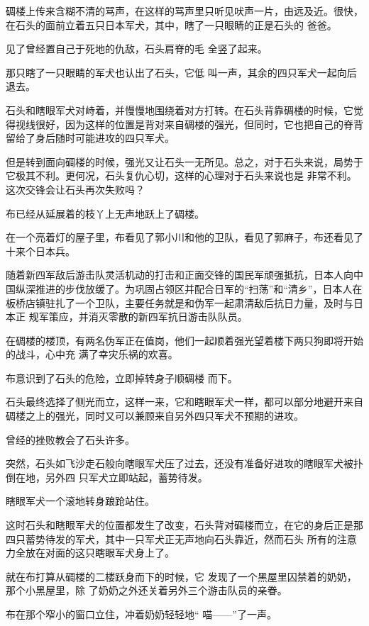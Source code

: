 \documentclass{article}
\begin{document}
碉楼上传来含糊不清的骂声，在这样的骂声里只听见吠声一片，由远及近。很快，在石头的面前立着五只日本军犬，其中，瞎了一只眼睛的正是石头的
爸爸。 

见了曾经置自己于死地的仇敌，石头肩脊的毛
全竖了起来。 

那只瞎了一只眼睛的军犬也认出了石头，它低
叫一声，其余的四只军犬一起向后退去。 

石头和瞎眼军犬对峙着，并慢慢地围绕着对方打转。在石头背靠碉楼的时候，它觉得视线很好，因为这样的位置是背对来自碉楼的强光，但同时，它也把自己的脊背留给了身后随时可能进攻的四只军犬。

\newpage

但是转到面向碉楼的时候，强光又让石头一无所见。总之，对于石头来说，局势于它极其不利。更何况，石头复仇心切，这样的心理对于石头来说也是
非常不利。这次交锋会让石头再次失败吗？ 

布已经从延展着的枝丫上无声地跃上了碉楼。

在一个亮着灯的屋子里，布看见了郭小川和他的卫队，看见了郭麻子，布还看见了十来个日本兵。

随着新四军敌后游击队灵活机动的打击和正面交锋的国民军顽强抵抗，日本人向中国纵深推进的步伐放缓了。为巩固占领区并配合日军的“扫荡”和“清乡”，日本人在板桥店镇驻扎了一个卫队，主要任务就是和伪军一起肃清敌后抗日力量，及时与日本正
规军策应，并消灭零散的新四军抗日游击队队员。 

在碉楼的楼顶，有两名伪军正在值岗，他们一起顺着强光望着楼下两只狗即将开始的战斗，心中充
满了幸灾乐祸的欢喜。 

\newpage

布意识到了石头的危险，立即掉转身子顺碉楼
而下。 

石头最终选择了侧光而立，这样一来，它和瞎眼军犬一样，都可以部分地避开来自碉楼之上的强光，同时又可以兼顾来自另外四只军犬不预期的进攻。


曾经的挫败教会了石头许多。 

突然，石头如飞沙走石般向瞎眼军犬压了过去，还没有准备好进攻的瞎眼军犬被扑倒在地，另外四
只军犬立即站起，蓄势待发。 


瞎眼军犬一个滚地转身踉跄站住。 

这时石头和瞎眼军犬的位置都发生了改变，石头背对碉楼而立，在它的身后正是那四只蓄势待发的军犬，其中一只军犬正无声地向石头靠近，然而石头
所有的注意力全放在对面的这只瞎眼军犬身上了。 

就在布打算从碉楼的二楼跃身而下的时候，它
\newpage
发现了一个黑屋里囚禁着的奶奶，那个小黑屋里，除
了奶奶之外还关着另外三个游击队员的亲眷。 

布在那个窄小的窗口立住，冲着奶奶轻轻地“
喵——”了一声。 
\end{document}
